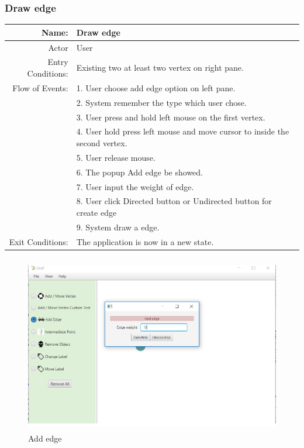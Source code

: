 \documentclass[a4paper,10pt]{article}
\begin{document}
\subsubsection{Draw edge}
	\begin{tabular}{|r|l|}
\hline
Name: & Draw edge \\
\hline
Actor & User \\
\hline
Entry Conditions: & Existing two at least two vertex on right pane. \\
\hline
Flow of Events: & 1. User choose add edge option on left pane. \\
& 2. System remember the type which user chose.  \\
& 3. User press and hold left mouse on the first vertex.  \\
& 4. User hold press left mouse and move cursor to inside the second vertex.  \\
& 5. User release mouse.  \\
& 6. The popup Add edge be showed.  \\
& 7. User input the weight of edge.  \\
& 8. User click Directed button or Undirected button for create edge   \\
& 9. System draw a edge.   \\
\hline
Exit Conditions: & The application is now in a new state. \\
\hline

\end{tabular}
	\paragraph{}
	
\begin{figure}[H]
		\centering
		\includegraphics[height = 3in]{addEdge1.png}
		\caption[Optional caption]{Add edge}
		\label{fig:Repository}
	\end{figure}
\end{document}
